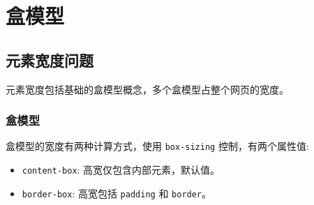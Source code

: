 \section{盒模型}

\subsection{元素宽度问题}

元素宽度包括基础的盒模型概念，多个盒模型占整个网页的宽度。

\subsubsection*{盒模型}

盒模型的宽度有两种计算方式，使用 \texttt{box-sizing} 控制，有两个属性值:
\begin{itemize}
    \item \texttt{content-box}: 高宽仅包含内部元素，默认值。
    \item \texttt{border-box}: 高宽包括 \texttt{padding} 和 \texttt{border}。
\end{itemize}

